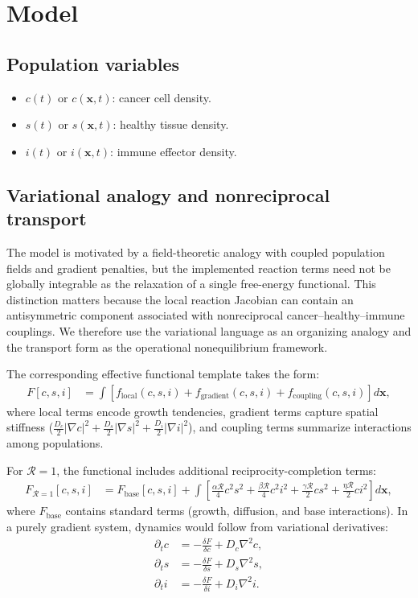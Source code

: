 \section{Model}\label{sec:model}

\subsection{Population variables}
\begin{itemize}
    \item $c(t)$ or $c(\mathbf{x},t)$: cancer cell density.
    \item $s(t)$ or $s(\mathbf{x},t)$: healthy tissue density.
    \item $i(t)$ or $i(\mathbf{x},t)$: immune effector density.
\end{itemize}

\subsection{Variational analogy and nonreciprocal transport}
The model is motivated by a field-theoretic analogy with coupled population fields and gradient penalties, but the implemented reaction terms need not be globally integrable as the relaxation of a single free-energy functional. This distinction matters because the local reaction Jacobian can contain an antisymmetric component associated with nonreciprocal cancer--healthy--immune couplings. We therefore use the variational language as an organizing analogy and the transport form as the operational nonequilibrium framework.

The corresponding effective functional template takes the form:
\begin{align}
F[c,s,i] &= \int \left[ f_{\text{local}}(c,s,i) + f_{\text{gradient}}(c,s,i) + f_{\text{coupling}}(c,s,i) \right] d\mathbf{x}, \label{eq:free_energy}
\end{align}
where local terms encode growth tendencies, gradient terms capture spatial stiffness ($\tfrac{D_c}{2}|\nabla c|^2 + \tfrac{D_s}{2}|\nabla s|^2 + \tfrac{D_i}{2}|\nabla i|^2$), and coupling terms summarize interactions among populations.

For $\mathcal{R}=1$, the functional includes additional reciprocity-completion terms:
\begin{align}
F_{\mathcal{R}=1}[c,s,i] &= F_{\text{base}}[c,s,i] + \int \left[ \tfrac{\alpha\mathcal{R}}{4} c^2 s^2 + \tfrac{\beta\mathcal{R}}{4} c^2 i^2 + \tfrac{\gamma\mathcal{R}}{2} c s^2 + \tfrac{\eta\mathcal{R}}{2} c i^2 \right] d\mathbf{x}, \label{eq:free_energy_R1}
\end{align}
where $F_{\text{base}}$ contains standard terms (growth, diffusion, and base interactions). In a purely gradient system, dynamics would follow from variational derivatives:
\begin{align}
\partial_t c &= -\frac{\delta F}{\delta c} + D_c \nabla^2 c, \\
\partial_t s &= -\frac{\delta F}{\delta s} + D_s \nabla^2 s, \\
\partial_t i &= -\frac{\delta F}{\delta i} + D_i \nabla^2 i.
\end{align}

